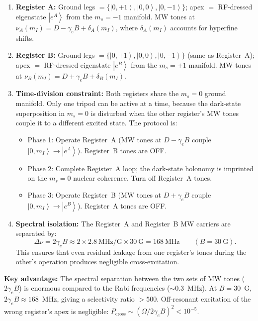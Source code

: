 \documentclass[11pt,letterpaper]{article}
\newcommand{\ket}[1]{\left|#1\right\rangle}
\begin{document}
\begin{enumerate}[leftmargin=*]
    \item \textbf{Register A:} Ground legs $= \{\ket{0, +1}, \ket{0, 0}, \ket{0, -1}\}$; apex $= $ RF-dressed eigenstate $\ket{e^A}$ from the $m_s = -1$ manifold. MW tones at $\nu_A(m_I) = D - \gamma_e B + \delta_A(m_I)$, where $\delta_A(m_I)$ accounts for hyperfine shifts.
    \item \textbf{Register B:} Ground legs $= \{\ket{0, +1}, \ket{0, 0}, \ket{0, -1}\}$ (same as Register~A); apex $= $ RF-dressed eigenstate $\ket{e^B}$ from the $m_s = +1$ manifold. MW tones at $\nu_B(m_I) = D + \gamma_e B + \delta_B(m_I)$.
    \item \textbf{Time-division constraint:} Both registers share the $m_s = 0$ ground manifold. Only one tripod can be active at a time, because the dark-state superposition in $m_s = 0$ is disturbed when the other register's MW tones couple it to a different excited state. The protocol is:
    \begin{itemize}
        \item Phase 1: Operate Register~A (MW tones at $D - \gamma_e B$ couple $\ket{0, m_I} \to \ket{e^A}$). Register~B tones are OFF.
        \item Phase 2: Complete Register~A loop; the dark-state holonomy is imprinted on the $m_s = 0$ nuclear coherence. Turn off Register~A tones.
        \item Phase 3: Operate Register~B (MW tones at $D + \gamma_e B$ couple $\ket{0, m_I} \to \ket{e^B}$). Register~A tones are OFF.
    \end{itemize}
    \item \textbf{Spectral isolation:} The Register~A and Register~B MW carriers are separated by:
    \begin{equation}
        \Delta\nu = 2\gamma_e B \approx 2 \times 2.8~\text{MHz/G} \times 30~\text{G} = 168~\text{MHz} \qquad (B = 30~\text{G}).
    \end{equation}
    This ensures that even residual leakage from one register's tones during the other's operation produces negligible cross-excitation.
\end{enumerate}

\medskip
\noindent\textbf{Key advantage:} The spectral separation between the two sets of MW tones ($2\gamma_e B$) is enormous compared to the Rabi frequencies ($\sim$0.3~MHz). At $B = 30$~G, $2\gamma_e B \approx 168$~MHz, giving a selectivity ratio $> 500$. Off-resonant excitation of the wrong register's apex is negligible: $P_\mathrm{cross} \sim (\Omega / 2\gamma_e B)^2 < 10^{-5}$.
\end{document}

